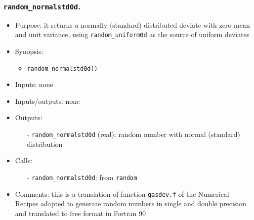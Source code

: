 \documentclass[12pt]{article}
\begin{document}
\subsubsection{{\tt random\_normalstd0d}.}
\begin{itemize}
\item Purpose: it returns a normally (standard) distributed deviate with zero mean and unit variance, using {\tt random\_uniform0d} as the source of uniform deviates
\item Synopsis: 
\begin{itemize}
\item {\tt random\_normalstd0d()}
\end{itemize}
\item Inputs: none
\item Inputs/outputs: none
\item Outputs:
\begin{itemize}
\item[-] {\tt random\_normalstd0d} (real): random number with normal (standard) distribution
\end{itemize}
\item Calls: 
\begin{itemize}
\item[-] {\tt random\_normalstd0d}: from {\tt random}
\end{itemize}
\item Comments: this is a translation of function {\tt gasdev.f} of the Numerical Recipes adapted to generate random numbers in single and double precision and translated to free format in Fortran 90
\end{itemize} 
\end{document}
